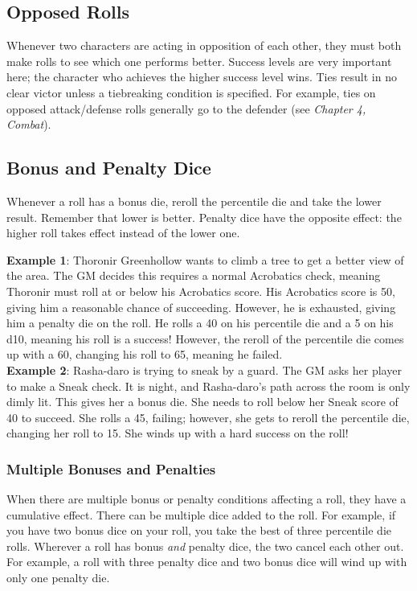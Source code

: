 \subsection{Opposed Rolls}
Whenever two characters are acting in opposition of each other, they must both make rolls to see which one performs better. Success levels are very important here; the character who achieves the higher success level wins. Ties result in no clear victor unless a tiebreaking condition is specified. For example, ties on opposed attack/defense rolls generally go to the defender (see \textit{Chapter 4, Combat}).

\subsection{Bonus and Penalty Dice}
Whenever a roll has a bonus die, reroll the percentile die and take the lower result. Remember that lower is better. Penalty dice have the opposite effect: the higher roll takes effect instead of the lower one.\\

\begin{tcolorbox}
\textbf{Example 1}: Thoronir Greenhollow wants to climb a tree to get a better view of the area. The GM decides this requires a normal Acrobatics check, meaning Thoronir must roll at or below his Acrobatics score. His Acrobatics score is 50, giving him a reasonable chance of succeeding. However, he is exhausted, giving him a penalty die on the roll. He rolls a 40 on his percentile die and a 5 on his d10, meaning his roll is a success! However, the reroll of the percentile die comes up with a 60, changing his roll to 65, meaning he failed.\\

\textbf{Example 2}: Rasha-daro is trying to sneak by a guard. The GM asks her player to make a Sneak check. It is night, and Rasha-daro's path across the room is only dimly lit. This gives her a bonus die. She needs to roll below her Sneak score of 40 to succeed. She rolls a 45, failing; however, she gets to reroll the percentile die, changing her roll to 15. She winds up with a hard success on the roll!
\end{tcolorbox}

\subsubsection{Multiple Bonuses and Penalties}
When there are multiple bonus or penalty conditions affecting a roll, they have a cumulative effect. There can be multiple dice added to the roll. For example, if you have two bonus dice on your roll, you take the best of three percentile die rolls. Wherever a roll has bonus \textit{and} penalty dice, the two cancel each other out. For example, a roll with three penalty dice and two bonus dice will wind up with only one penalty die.


